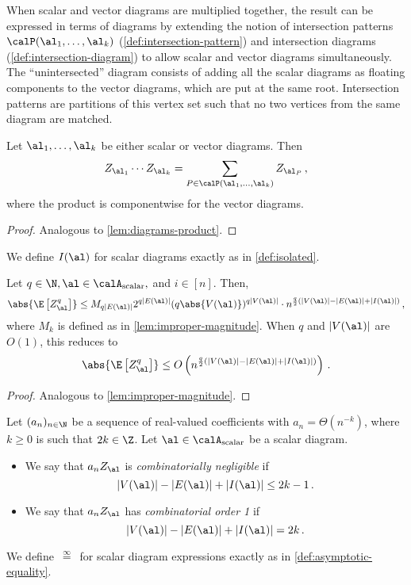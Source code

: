 \documentclass[12pt]{article}
\newcommand{\scalar}{\textnormal{scalar}}
\newcommand{\eqinf}{\,\overset{\infty}{=}\,}
\begin{document}
    When scalar and vector diagrams are multiplied together, the result can be expressed in terms of diagrams by extending the notion of intersection patterns $\calP(\al_1, \dots, \al_k)$ (\cref{def:intersection-pattern}) and intersection diagrams (\cref{def:intersection-diagram})
    to allow scalar and vector diagrams simultaneously. The ``unintersected'' diagram
    consists of adding all the scalar diagrams as floating components to the vector diagrams, which are put at the same root.
    Intersection patterns are partitions of this vertex set
    such that no two vertices from the same diagram are matched.
    \begin{lemma}\label{lem:scalar-product}
        Let $\al_1, \dots, \al_k$ be either scalar or vector diagrams.
        Then \[
        Z_{\al_1}\cdots Z_{\al_k}  = \sum_{P \in \calP(\al_1,\dots, \al_k)} Z_{\al_P}\,,\]
        where the product is componentwise for the vector diagrams.
    \end{lemma}
    \begin{proof}
        Analogous to \cref{lem:diagrams-product}.
    \end{proof}

We define $I(\al)$ for scalar diagrams exactly as in \cref{def:isolated}.

\begin{lemma}\label{lem:improper-magnitude-scalar}
    Let $q\in\N, \al \in \calA_\scalar,$ and $i \in [n]$. Then,
    \[
        \abs{\E\left[Z_{\al}^q\right]} \leq M_{q|E(\al)|} 2^{q|E(\al)|}  (q\abs{V(\al)})^{q|V(\al)|} \cdot n^{\frac q 2\left(|V(\al)| - |E(\al)|+|I(\al)|\right)}\,,
    \]
    where $M_k$ is defined as in \cref{lem:improper-magnitude}.
    When $q$ and $|V(\al)|$ are $O(1)$, this reduces to
    \[
        \abs{\E\left[Z_{\al}^q\right]} \leq O\left( n^{\frac q 2\left(|V(\al)| - |E(\al)|+|I(\al)|\right)}\right)\,.
    \]
\end{lemma}

\begin{proof}
    Analogous to \cref{lem:improper-magnitude}.
\end{proof}

\begin{definition}
\label{def:combinatorially-negligible-scalar}
    Let $(a_n)_{n\in\N}$ be a sequence of real-valued coefficients with $a_n = \Theta(n^{-k})$, where $k\ge 0$ is such that $2k \in \Z$. Let $\al \in \calA_{\scalar}$ be a scalar diagram. 
    \begin{itemize}
    \item We say that $a_n Z_\al$ is \emph{combinatorially negligible}
    if
    \[|V(\al)| - |E(\al)| + |I(\al)| \leq 2k - 1\,.\]
    \item We say that $a_n Z_\al$ has \emph{combinatorial order 1} if
    \[|V(\al)| - |E(\al)| + |I(\al)| = 2k\,.\]
    \end{itemize}

    We define $\eqinf$ for scalar diagram expressions exactly as in \cref{def:asymptotic-equality}.
\end{definition}
\end{document}
